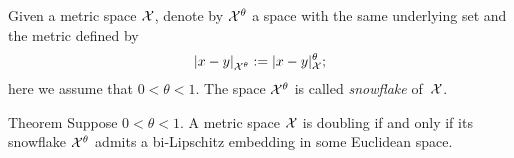 Given a metric space $\mathcal{X}$, 
denote by $\mathcal{X}^\theta$ a space with the same underlying set and the metric defined by 
\[\dist{x}{y}{\spc{X}^\theta}
\df
\dist[\theta]{x}{y}{\spc{X}};\]
here we assume that $0<\theta<1$.
The space $\mathcal{X}^\theta$ is called \emph{snowflake} of~$\mathcal{X}$.

\begin{thm}{Theorem}\label{thm:assuad}
Suppose $0<\theta<1$.
A metric space $\mathcal{X}$ is doubling if and only if its snowflake $\mathcal{X}^\theta$ admits a
bi-Lipschitz embedding in some Euclidean space.
\end{thm}


